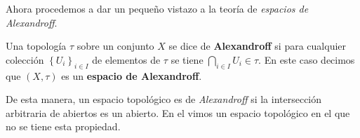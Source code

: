 Ahora procedemos a dar un pequeño vistazo a la teoría de \textit{espacios de Alexandroff}.
\begin{Def}
   Una topología $\tau$ sobre un conjunto $X$ se dice de \textbf{Alexandroff} si para cualquier colección $\left\{ U_i\right\}_{i\in I}$ de elementos de $\tau$ se tiene $\bigcap_{i\in I}U_i \in\tau$. En este caso decimos que $(X,\tau)$ es un \textbf{espacio de Alexandroff}.
\end{Def}
De esta manera, un espacio topológico es de \textit{Alexandroff} si la intersección arbitraria de abiertos es un abierto. En el  vimos un espacio topológico en el que no se tiene esta propiedad.\\\\
